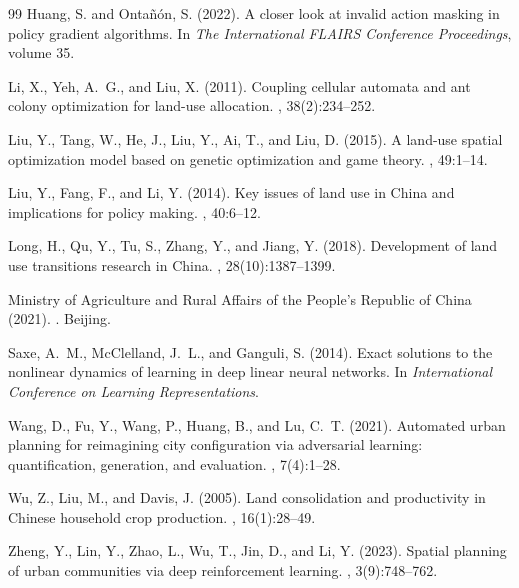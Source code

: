 \documentclass[preprint,12pt]{elsarticle}
\begin{document}
\begin{thebibliography}{99}
Huang, S. and Onta\~{n}\'{o}n, S. (2022).
\newblock A closer look at invalid action masking in policy gradient algorithms.
\newblock In {\em The International FLAIRS Conference Proceedings}, volume 35.

Li, X., Yeh, A.~G., and Liu, X. (2011).
\newblock Coupling cellular automata and ant colony optimization for land-use allocation.
, 38(2):234--252.

Liu, Y., Tang, W., He, J., Liu, Y., Ai, T., and Liu, D. (2015).
\newblock A land-use spatial optimization model based on genetic optimization and game theory.
, 49:1--14.

Liu, Y., Fang, F., and Li, Y. (2014).
\newblock Key issues of land use in {China} and implications for policy making.
, 40:6--12.

Long, H., Qu, Y., Tu, S., Zhang, Y., and Jiang, Y. (2018).
\newblock Development of land use transitions research in {China}.
, 28(10):1387--1399.

Ministry of Agriculture and Rural Affairs of the People's Republic of China (2021).
.
\newblock Beijing.

Saxe, A.~M., McClelland, J.~L., and Ganguli, S. (2014).
\newblock Exact solutions to the nonlinear dynamics of learning in deep linear neural networks.
\newblock In {\em International Conference on Learning Representations}.

Wang, D., Fu, Y., Wang, P., Huang, B., and Lu, C.~T. (2021).
\newblock Automated urban planning for reimagining city configuration via adversarial learning: quantification, generation, and evaluation.
, 7(4):1--28.

Wu, Z., Liu, M., and Davis, J. (2005).
\newblock Land consolidation and productivity in {Chinese} household crop production.
, 16(1):28--49.

Zheng, Y., Lin, Y., Zhao, L., Wu, T., Jin, D., and Li, Y. (2023).
\newblock Spatial planning of urban communities via deep reinforcement learning.
, 3(9):748--762.


\end{thebibliography}
\end{document}
